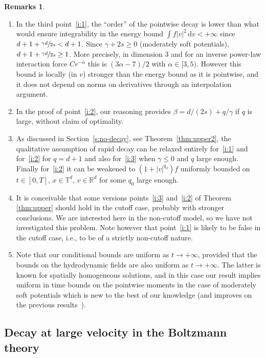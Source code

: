 \documentclass[11pt]{article}
\newcommand{\ie}{i.e.,\xspace}
\newcommand{\skpt}{\smallskip}
\theoremstyle{plain}
\theoremstyle{definition}
\newtheorem{remarks}[thm]{Remarks}
\numberwithin{equation}{section}
\newcommand{\R}{\mathbb R}
\newcommand{\dd} {\, \mathrm{d}}
\begin{document}
\skpt
\begin{remarks}
\begin{enumerate}
\item In the third point~\eqref{i:1}, the ``order'' of the pointwise
decay is lower than what would ensure integrability in the energy
bound $\int f |v|^2 \dd v <+\infty$ since
$d+1+ \sfrac{\gamma d}{2s}<d+1$. Since $\gamma+2s \ge 0$
(moderately soft potentials), $d+1+\sfrac{\gamma d}{2s} \ge
1$. More precisely, in dimension $3$ and for an inverse power-law
interaction force $Cr^{-\alpha}$ this is $(3\alpha-7)/2$ with
$\alpha \in [3,5)$. However this bound is locally (in $v$)
stronger than the energy bound as it is pointwise, and it does not
depend on norms on derivatives through an interpolation argument.

\item In the proof of point~\eqref{i:2}, our reasoning provides
$\beta = d/(2s) + q/\gamma$ if $q$ is large, without claim of
optimality.
\item As discussed in Section~\ref{s:no-decay}, see
Theorem~\ref{thm:upper2}, the qualitative assumption of rapid decay
can be relaxed entirely for~\eqref{i:1} and for~\eqref{i:2} for
$q=d+1$ and also for~\eqref{i:3} when $\gamma \le 0$ and $q$ large
enough. Finally for~\eqref{i:2} it can be weakened to $(1+|v|^{q_0})f$
uniformly bounded on $t \in [0,T]$, $x \in \mathbb{T}^d$, $v \in
\R^d$ for some $q_0$ large enough.
\item It is conceivable that some versions points~\eqref{i:3}
and~\eqref{i:2} of Theorem \ref{thm:upper} should hold in the
cutoff case, probably with stronger conclusions. We are interested
here in the non-cutoff model, so we have not investigated this
problem. Note however that point~\eqref{i:1} is likely to be false
in the cutoff case, \ie to be of a strictly non-cutoff nature.
\item
Note that our conditional bounds are uniform as $t \to +\infty$, provided that the bounds on the hydrodynamic fields are also uniform as $t \to +\infty$. The latter is known for spatially homogeneous solutions, and in this case our result implies uniform in time bounds on the pointwise moments in the case of moderately soft potentials which is new to the best of our knowledge (and improves on the previous results~\cite{MR1233644,MR2359877}).
\end{enumerate}
\end{remarks}

\subsection{Decay at large velocity in the Boltzmann theory}
\end{document}
